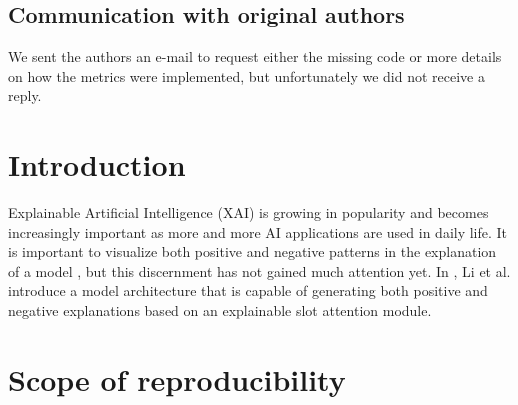 \subsection*{Communication with original authors}
We sent the authors an e-mail to request either the missing code or more details on how the metrics were implemented, but unfortunately we did not receive a reply.
\newpage

\section{Introduction}
Explainable Artificial Intelligence (XAI) is growing in popularity and becomes increasingly important as more and more AI applications are used in daily life. It is important to visualize both positive and negative patterns in the explanation of a model \cite{patterns}, but this discernment has not gained much attention yet. In \cite{scouter}, Li et al. introduce a model architecture that is capable of generating both positive and negative explanations based on an explainable slot attention module.

\section{Scope of reproducibility}
\label{sec:claims}



